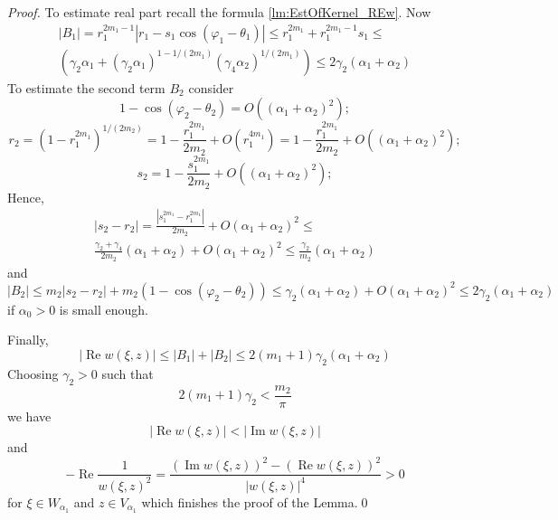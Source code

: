 \documentclass[10pt,a4paper]{amsart}
\newcommand{\IM}{ \mathop{\mathrm{Im}}  }
\newcommand{\RE}{ \mathop{\mathrm{Re}} }
\newcommand{\abs}[1]{\left\vert #1 \right\vert}
\begin{document}
\begin{proof}
	To estimate real part recall the formula \eqref{lm:EstOfKernel_REw}. Now
	\begin{multline*}
	\abs{B_1}=r_1^{2m_1-1}\abs{ r_1-s_1\cos(\varphi_1-\theta_1) } \leq r_1^{2m_1} + r_1^{2m_1-1} s_1 \leq \\	\left( \gamma_2\alpha_1+(\gamma_2\alpha_1)^{ 1-1/(2m_1) }(\gamma_{4}\alpha_2)^{ 1/(2m_1) }\right)\leq 2\gamma_2(\alpha_1+\alpha_2)
	\end{multline*}
	To estimate the second term $B_2$ consider
	$$ 
	1-\cos(\varphi_2-\theta_2) = O((\alpha_1+\alpha_2)^2);
	$$
	$$
	r_2=\left(1-r_1^{2m_1}\right)^{1/(2m_2)} = 1-\frac{r_1^{2m_1}}{2m_2} + O(r_1^{4m_1}) = 1-\frac{r_1^{2m_1}}{2m_2} + O((\alpha_1+\alpha_2)^2);
	$$
	$$
	s_2 = 1-\frac{s_1^{2m_1}}{2m_2} + O((\alpha_1+\alpha_2)^2);
	$$
	Hence,
	\begin{multline*}
		\abs{s_2-r_2} =  \frac{ \abs{s_1^{2m_1}-r_1^{2m_1}} }{  2m_2 } + O(\alpha_1+\alpha_2)^2 \leq \\
		\frac{\gamma_2 + \gamma_4}{2m_2}(\alpha_1+\alpha_2)+O(\alpha_1+\alpha_2)^2\leq \frac{\gamma_2}{m_2} (\alpha_1+\alpha_2)
	\end{multline*}
	and
	$$\abs{B_2}\leq m_2\abs{s_2-r_2}+m_2(1-\cos(\varphi_2-\theta_2))\leq 
	\gamma_2 (\alpha_1+\alpha_2) +O(\alpha_1+\alpha_2)^2\leq 2 \gamma_2 (\alpha_1+\alpha_2)
	$$
	if $\alpha_0>0$ is small enough. 	
	
	Finally,
 	$$
		\abs{\RE w(\xi,z) }\leq \abs{B_1}+\abs{B_2} \leq 2\left(m_1+1\right)\gamma_{2}(\alpha_1+\alpha_2)
	$$
	Choosing $\gamma_{2}>0$ such that
	$$ 2\left(m_1+1\right)\gamma_{2} < \frac{m_2}{\pi}$$
	we have 
	$$\abs{\RE w(\xi,z)} < \abs{\IM w(\xi,z)}$$
	and
	$$-\RE \frac{1}{w(\xi,z)^2} = \frac{(\IM{w(\xi,z)})^2-(\RE{w(\xi,z)})^2}{\abs{w(\xi,z)}^4} >0$$
	for $\xi\in W_{\alpha_1}$ and $z\in V_{\alpha_1}$ 
	which finishes the proof of the Lemma.\qed	
\end{proof}
\end{document}
